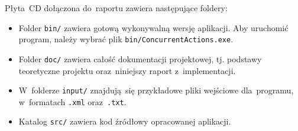 \documentclass[11pt,a4paper]{article}
\begin{document}
Płyta~CD dołączona do~raportu zawiera następujące foldery:

\begin{itemize}
    \item Folder \verb+bin/+ zawiera gotową wykonywalną wersję aplikacji.
    Aby uruchomić program, należy wybrać plik \verb+bin/ConcurrentActions.exe+.
    \item Folder \verb+doc/+ zawiera całość dokumentacji projektowej, tj. podstawy teoretyczne projektu oraz~niniejszy raport z~implementacji.
    \item W~folderze \verb+input/+ znajdują~się przykładowe pliki wejściowe dla~programu, w~formatach \verb+.xml+ oraz~\verb+.txt+.
    \item Katalog \verb+src/+ zawiera kod źródłowy opracowanej aplikacji.
\end{itemize}
\end{document}
